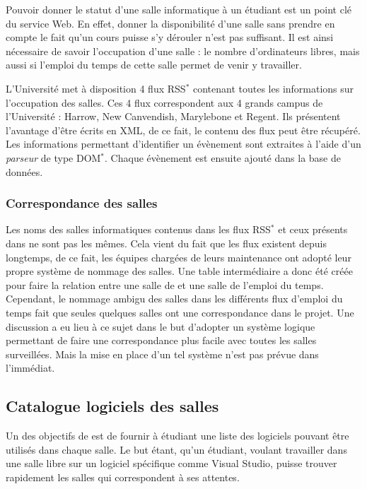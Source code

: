 Pouvoir donner le statut d'une salle informatique \`a un \'etudiant est un point cl\'e du service Web.
En effet, donner la disponibilit\'e d'une salle sans prendre en compte le fait qu'un cours puisse s'y d\'erouler n'est pas suffisant.
Il est ainsi n\'ecessaire de savoir l'occupation d'une salle : le nombre d'ordinateurs libres, mais aussi si l'emploi du temps de cette salle permet de venir y travailler.

L'Universit\'e met \`a disposition 4 flux RSS$^*$ contenant toutes les informations sur l'occupation des salles.
Ces 4 flux correspondent aux 4 grands campus de l'Universit\'e : Harrow, New Canvendish, Marylebone et Regent.
Ils pr\'esentent l'avantage d'\^etre \'ecrits en XML, de ce fait, le contenu des flux peut \^etre r\'ecup\'er\'e.
Les informations permettant d'identifier un \'ev\`enement sont extraites \`a l'aide d'un \textit{parseur} de type DOM$^*$.
Chaque \'ev\`enement est ensuite ajout\'e dans la base de donn\'ees.

\subsubsection{Correspondance des salles}

Les noms des salles informatiques contenus dans les flux RSS$^*$ et ceux pr\'esents dans {\YuukouII} ne sont pas les m\^emes.
Cela vient du fait que les flux existent depuis longtemps, de ce fait, les \'equipes charg\'ees de leurs maintenance ont adopt\'e leur propre syst\`eme de nommage des salles.
Une table interm\'ediaire a donc \'et\'e cr\'e\'ee pour faire la relation entre une salle de {\YuukouII} et une salle de l'emploi du temps.
Cependant, le nommage ambigu des salles dans les diff\'erents flux d'emploi du temps fait que seules quelques salles ont une correspondance dans le projet.
Une discussion a eu lieu \`a ce sujet dans le but d'adopter un syst\`eme logique permettant de faire une correspondance plus facile avec toutes les salles surveill\'ees.
Mais la mise en place d'un tel syst\`eme n'est pas pr\'evue dans l'imm\'ediat.

\subsection{Catalogue logiciels des salles}
\label{section:catalogueLogiciel}

Un des objectifs de {\YuukouII} est de fournir \`a \'etudiant une liste des logiciels pouvant \^etre utilis\'es dans chaque salle.
Le but \'etant, qu'un \'etudiant, voulant travailler dans une salle libre sur un logiciel sp\'ecifique comme Visual Studio, puisse trouver rapidement les salles qui correspondent \`a ses attentes.

